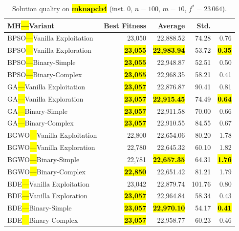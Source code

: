 \documentclass[mathematics,article,accept,moreauthors]{Definitions/mdpi}
\begin{document}
\begin{table}[H]
  \small
  \caption{Solution quality on \textbf{\hl{mknapcb4}} (inst. 0, $n=100$, $m=10$, $f^*=23\,064$).}
  \label{tab:calidad_mknapcb4_0}
  \begin{tabularx}{\textwidth}{lRRRR}
    \toprule
    \textbf{MH\hl{---}Variant} &
    \textbf{Best Fitness} &
    \textbf{Average} &
    \textbf{Std.} &
    \textbf{} \\
    \midrule
    BPSO\hl{---}Vanilla Exploitation &          23,050 &         22,888.52 &  74.28 &         0.76 \\
    BPSO\hl{---}Vanilla Exploration  & \textbf{\hl{23,055}} & \textbf{\hl{22,983.94}} &  53.72 & \textbf{\hl{0.35}} \\
    BPSO\hl{---}Binary-Simple        & \textbf{\hl{23,055}} &         22,948.87 &  52.51 &         0.50 \\
    BPSO\hl{---}Binary-Complex       & \textbf{\hl{23,055}} &         22,968.35 &  58.21 &         0.41 \\
    \midrule
    GA\hl{---}Vanilla Exploitation   & \textbf{\hl{23,057}} &         22,876.87 &  90.41 &         0.81 \\
    GA\hl{---}Vanilla Exploration    & \textbf{\hl{23,057}} & \textbf{\hl{22,915.45}} &  74.49 & \textbf{\hl{0.64}} \\
    GA\hl{---}Binary-Simple          & \textbf{\hl{23,057}} &         22,911.58 &  70.00 &         0.66 \\
    GA\hl{---}Binary-Complex         & \textbf{\hl{23,057}} &         22,910.55 &  84.55 &         0.67 \\
    \midrule
    BGWO\hl{---}Vanilla Exploitation &          22,800 &         22,654.06 &  80.20 &         1.78 \\
    BGWO\hl{---}Vanilla Exploration  &          22,780 &         22,645.32 &  60.10 &         1.82 \\
    BGWO\hl{---}Binary-Simple        &          22,781 & \textbf{\hl{22,657.35}} &  64.31 & \textbf{\hl{1.76}} \\
    BGWO\hl{---}Binary-Complex       & \textbf{\hl{22,850}} &         22,651.42 &  81.21 &         1.79 \\
    \midrule
    BDE\hl{---}Vanilla Exploitation  &          23,042 &         22,879.74 & 101.76 &         0.80 \\
    BDE\hl{---}Vanilla Exploration   & \textbf{\hl{23,057}} &         22,964.84 &  58.34 &         0.43 \\
    BDE\hl{---}Binary-Simple         & \textbf{\hl{23,057}} & \textbf{\hl{22,970.10}} &  54.17 & \textbf{\hl{0.41}} \\
    BDE\hl{---}Binary-Complex        & \textbf{\hl{23,057}} &         22,958.77 &  60.23 &         0.46 \\
    \bottomrule
  \end{tabularx}
\end{table}
\end{document}
